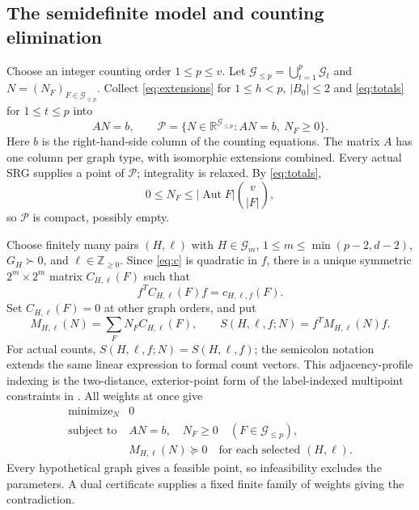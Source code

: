 \documentclass[11pt]{article}
\theoremstyle{remark}
\newcommand{\R}{\mathbb R}
\newcommand{\Z}{\mathbb Z}
\DeclareMathOperator{\Aut}{Aut}
\numberwithin{equation}{section}
\begin{document}
\subsection{The semidefinite model and counting elimination}\label{subsec:sdp}
Choose an integer counting order $1\le p\le v$. Let
$\mathcal G_{\le p}=\bigcup_{t=1}^p\mathcal G_t$ and
$N=(N_F)_{F\in\mathcal G_{\le p}}$.
Collect \eqref{eq:extensions} for $1\le h<p$, $|B_0|\le2$ and
\eqref{eq:totals} for $1\le t\le p$ into
\begin{equation}\label{eq:AN}
 AN=b,\qquad
 \mathcal P=\{N\in\R^{\mathcal G_{\le p}}:AN=b,\ N_F\ge0\}.
\end{equation}
Here $b$ is the right-hand-side column of the counting equations.
The matrix $A$ has one column per graph type, with isomorphic extensions
combined. Every actual SRG supplies a point of $\mathcal P$; integrality
is relaxed. By \eqref{eq:totals},
\begin{equation}\label{eq:countbound}
 0\le N_F\le |\Aut F|\binom{v}{|F|},
\end{equation}
so $\mathcal P$ is compact, possibly empty.

Choose finitely many pairs $(H,\ell)$ with $H\in\mathcal G_m$,
$1\le m\le\min(p-2,d-2)$, $G_H\succ0$, and $\ell\in\Z_{\ge0}$.
Since \eqref{eq:c} is quadratic in $f$,
there is a unique symmetric $2^m\times2^m$ matrix $C_{H,\ell}(F)$ such that
\[
 f^TC_{H,\ell}(F)f=c_{H,\ell,f}(F).
\]
Set $C_{H,\ell}(F)=0$ at other graph orders, and put
\begin{equation}\label{eq:M}
 M_{H,\ell}(N)=\sum_F N_FC_{H,\ell}(F),\qquad
 S(H,\ell,f;N)=f^TM_{H,\ell}(N)f.
\end{equation}
For actual counts, $S(H,\ell,f;N)=S(H,\ell,f)$; the semicolon notation
extends the same linear expression to formal count vectors.
This adjacency-profile indexing is the two-distance, exterior-point
form of the label-indexed multipoint constraints in
\cite[Theorem~2.13]{kaoyu}. All weights at once give
\begin{equation}\label{eq:primal}
 \begin{array}{ll}
 \text{minimize}_{N}&0\\
 \text{subject to}&AN=b,\quad N_F\ge0\quad(F\in\mathcal G_{\le p}),\\
 &M_{H,\ell}(N)\succeq0\quad\text{for each selected }(H,\ell).
 \end{array}
\end{equation}
Every hypothetical graph gives a feasible point, so infeasibility excludes
the parameters. A dual certificate supplies a fixed finite family of
weights giving the contradiction.
\end{document}
